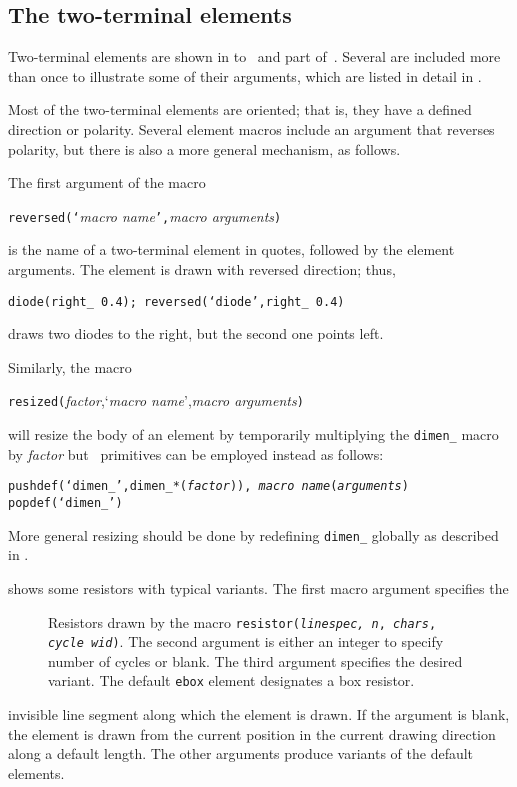 \subsection{The two-terminal elements\label{Twoterminal:}}
Two-terminal elements are shown in
 to~ and part of~.
Several are included more than once to illustrate
some of their arguments, which are listed in detail in .

Most of the two-terminal elements are oriented; that is, they have
a defined direction or polarity.  Several element macros include an
argument that reverses polarity, but there is also a more general
mechanism, as follows.

The first argument of the macro
\par
{\tt reversed(`}{\sl macro name}{\tt',}{\sl macro arguments}{\tt )}
\par
\noindent
is the name of a two-terminal element in quotes, followed by the
element arguments.  The element is drawn with reversed direction; thus,
\par
{\tt diode(right\_ 0.4); reversed(`diode',right\_ 0.4)}
\par
\noindent
draws two diodes to the right, but the second one points left.

Similarly, the macro
\par
{\tt resized(}{\sl factor},`{\sl macro name}',{\sl macro arguments}{\tt )}
\par
\noindent
will resize the body of an element by temporarily multiplying
the {\tt dimen\_} macro by {\sl factor} but
\Mfour\ primitives can be employed instead as follows:
\par
{\tt pushdef(`dimen\_',dimen\_*({\sl factor})),%
{\sl macro name}({\sl arguments}) popdef(`dimen\_')}
\par
\noindent
More general resizing should be
done by redefining {\tt dimen\_} globally as described in .

\enlargethispage{\baselineskip}
 shows some resistors with typical variants.
The first macro argument specifies the
\begin{figure}[H]
   
   \caption{Resistors drawn by the macro
   {\tt resistor({\sl linespec, n}, {\sl chars}, {\sl cycle wid})}.
   The second argument is either an integer to specify number of cycles
   or blank. The third argument specifies the desired variant.
   The default {\tt ebox} element designates a box resistor.}
   \label{Resistors}
   \end{figure}
\noindent%
invisible line segment along which the element is drawn.
If the argument is blank,
the element is drawn from the current position in the current drawing
direction along a default length.
The other arguments produce variants of the default elements.

